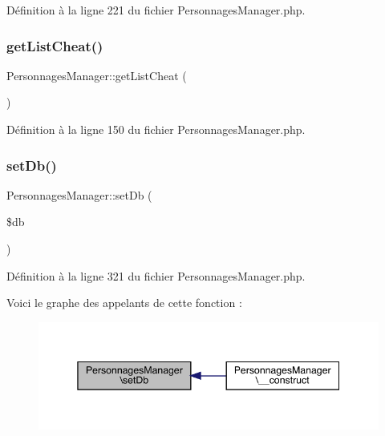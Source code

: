 Définition à la ligne 221 du fichier Personnages\+Manager.\+php.

\mbox{\label{class_personnages_manager_ac8ff12b20aab3b59b50efaeb851d8845}} 
\subsubsection{\texorpdfstring{get\+List\+Cheat()}{getListCheat()}}
{\footnotesize\ttfamily Personnages\+Manager\+::get\+List\+Cheat (\begin{DoxyParamCaption}{ }\end{DoxyParamCaption})}



Définition à la ligne 150 du fichier Personnages\+Manager.\+php.

\mbox{\label{class_personnages_manager_ad34d7d8f0716d1261437eff3eb7af7d0}} 
\subsubsection{\texorpdfstring{set\+Db()}{setDb()}}
{\footnotesize\ttfamily Personnages\+Manager\+::set\+Db (\begin{DoxyParamCaption}\item[{}]{\$db }\end{DoxyParamCaption})}



Définition à la ligne 321 du fichier Personnages\+Manager.\+php.

Voici le graphe des appelants de cette fonction \+:\nopagebreak
\begin{figure}[H]
\begin{center}
\leavevmode
\includegraphics[width=345pt]{class_personnages_manager_ad34d7d8f0716d1261437eff3eb7af7d0_icgraph}
\end{center}
\end{figure}
\mbox{\label{class_personnages_manager_abae7db357c0730386a2804f1716d26f2}} 
